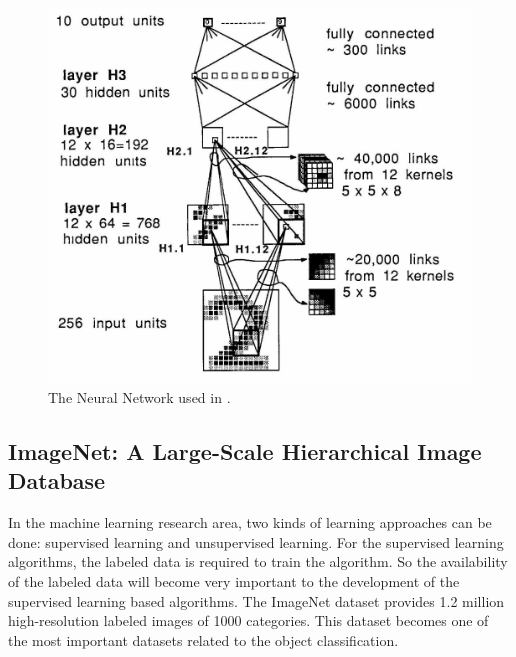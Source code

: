 \documentclass[a4paper,12pt]{article}
\begin{document}
\begin{figure}[H]
  \begin{center}
      \includegraphics[scale=0.8]{bpzip.png}
\end{center}
\caption{The Neural Network used in \cite{doi:10.1162/neco.1989.1.4.541}.}
 \label{fig:bpzip}
 \end{figure}
 
\subsection{ImageNet: A Large-Scale Hierarchical Image Database\cite{imagenet_cvpr09}}
In the machine learning research area, two kinds of learning approaches can be done: supervised learning and unsupervised learning. For the supervised learning algorithms, the labeled data is required to train the algorithm. So the availability of the labeled data will become very important to the development of the supervised learning based algorithms. The ImageNet dataset \cite{imagenet_cvpr09} provides 1.2 million high-resolution labeled images of 1000 categories. This dataset becomes one of the most important datasets related to the object classification.\\


               


  
 
\end{document}
